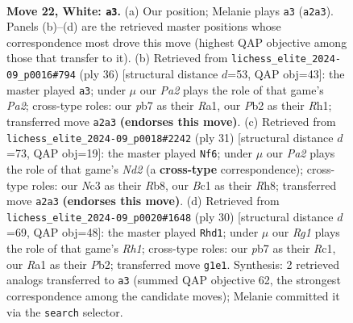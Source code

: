 \documentclass[11pt]{article}
\begin{document}
\clearpage

\begin{figure}[p]\centering
\begin{subfigure}{0.46\textwidth}\centering
\resizebox{\linewidth}{!}{%
\newchessgame
\chessboard[
  setfen={r4r1b/1ppb1k2/p1n5/4pp1p/2P5/2N2N2/PPB1KPP1/R1B3R1 w - - 0 22},
  showmover=false,
  pgfstyle=straightmove, color=movearrow, markmove={a2-a3}
]}
\caption{}
\end{subfigure}\hfill
\begin{subfigure}{0.46\textwidth}\centering
\resizebox{\linewidth}{!}{%
\newchessgame
\chessboard[
  setfen={2k4r/3rbppp/pBb1pn2/1p6/8/2N2P2/PPP1BKPP/R6R w - - 4 19},
  showmover=false,
  pgfstyle=straightmove, color=movearrow, markmove={a2-a3}
]}
\caption{}
\end{subfigure}
\\[4pt]
\begin{subfigure}{0.46\textwidth}\centering
\resizebox{\linewidth}{!}{%
\newchessgame
\chessboard[
  setfen={1r2k2r/1b1n1ppp/pp1Pp3/2p5/5P2/4P3/PP1BB1PP/R2R2K1 b k - 0 16},
  showmover=false,
  pgfstyle=straightmove, color=movearrow, markmove={d7-f6}
]}
\caption{}
\end{subfigure}\hfill
\begin{subfigure}{0.46\textwidth}\centering
\resizebox{\linewidth}{!}{%
\newchessgame
\chessboard[
  setfen={r2r2k1/pp1b1p2/4pp1p/8/1nBN4/4P3/PP2KPPP/2R4R w - - 3 16},
  showmover=false,
  pgfstyle=straightmove, color=movearrow, markmove={h1-d1}
]}
\caption{}
\end{subfigure}
\caption{\textbf{Move 22, White: \texttt{a3}.} (a) Our position; Melanie plays \texttt{a3} (\texttt{a2a3}). Panels (b)--(d) are the retrieved master positions whose correspondence most drove this move (highest QAP objective among those that transfer to it). (b) Retrieved from \texttt{lichess\_elite\_2024-09\_p0016\#794} (ply 36) [structural distance $d$=53, QAP obj=43]: the master played \texttt{a3}; under $\mu$ our \emph{Pa2} plays the role of that game's \emph{Pa2}; cross-type roles: our \emph{p}b7 as their \emph{R}a1, our \emph{P}b2 as their \emph{R}h1; transferred move \texttt{a2a3} \textbf{(endorses this move)}. (c) Retrieved from \texttt{lichess\_elite\_2024-09\_p0018\#2242} (ply 31) [structural distance $d$=73, QAP obj=19]: the master played \texttt{Nf6}; under $\mu$ our \emph{Pa2} plays the role of that game's \emph{Nd2} (a \textbf{cross-type} correspondence); cross-type roles: our \emph{N}c3 as their \emph{R}b8, our \emph{B}c1 as their \emph{R}h8; transferred move \texttt{a2a3} \textbf{(endorses this move)}. (d) Retrieved from \texttt{lichess\_elite\_2024-09\_p0020\#1648} (ply 30) [structural distance $d$=69, QAP obj=48]: the master played \texttt{Rhd1}; under $\mu$ our \emph{Rg1} plays the role of that game's \emph{Rh1}; cross-type roles: our \emph{p}b7 as their \emph{R}c1, our \emph{R}a1 as their \emph{P}b2; transferred move \texttt{g1e1}. Synthesis: 2 retrieved analogs transferred to \texttt{a3} (summed QAP objective 62, the strongest correspondence among the candidate moves); Melanie committed it via the \texttt{search} selector.}
\label{fig:thought-m42}
\end{figure}
\end{document}
